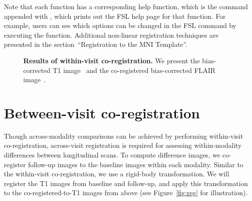 Note that each  function has a corresponding help function, which is the  command appended with , which prints out the FSL help page for that function.  For example, users can see which options can be changed in the FSL  command by executing the  function.   Additional non-linear registration techniques are presented in the section~``Registration to the MNI Template''.  









\begin{figure}
\hfill
\caption{{\bf Results of within-visit co-registration.}  We present the bias-corrected T1 image~\protect{} and the co-registered bias-corrected FLAIR image~\protect{}.  }
\label{fig:coreg}
\end{figure}


\section{Between-visit co-registration}
Though across-modality comparisons can be achieved by performing within-visit co-registration, across-visit registration is required for assessing within-modality differences between longitudinal scans.   To compute difference images, we co-register follow-up images to the baseline images within each modality.  Similar to the within-visit co-registration, we use a rigid-body transformation.  We will register the T1 images from baseline and follow-up, and apply this transformation to the co-registered-to-T1 images from above (see Figure~\ref{fig:reg} for illustration).  

